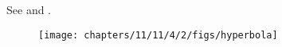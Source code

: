 See 
and 
.
\begin{figure}[H]
	\begin{center} 
	    \texttt{[image: chapters/11/11/4/2/figs/hyperbola]}
	\end{center}
\caption{}
\label{fig:chapters/11/11/4/2/Fig1}
\end{figure}




